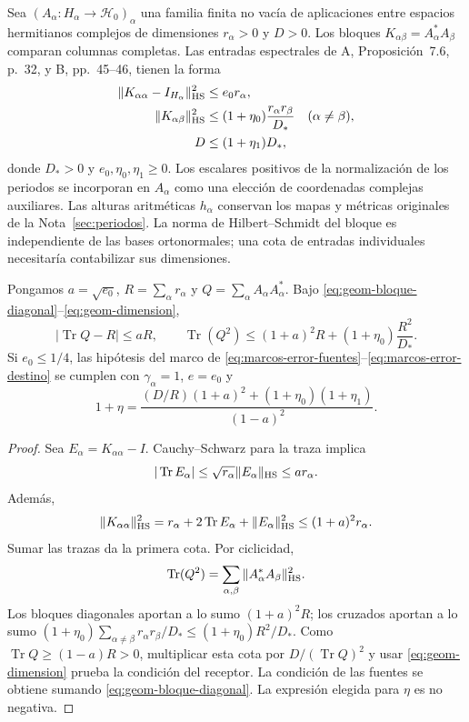 Sea $(A_\alpha:H_\alpha\to\mathcal H_0)_\alpha$ una familia
finita no vacía de aplicaciones entre
espacios hermitianos complejos de dimensiones
$r_\alpha>0$ y $D>0$.
Los bloques
$K_{\alpha\beta}=A_\alpha^*A_\beta$
comparan columnas completas.
Las entradas espectrales de A, Proposición~7.6, p.~32,
y B, pp.~45--46, tienen la forma
\begin{align}
 \|K_{\alpha\alpha}-I_{H_\alpha}\|_{\rm HS}^2
       &\le e_0r_\alpha,
       \label{eq:geom-bloque-diagonal}\\
 \|K_{\alpha\beta}\|_{\rm HS}^2
       &\le(1+\eta_0)\frac{r_\alpha r_\beta}{D_*}
       \quad(\alpha\ne\beta),
       \label{eq:geom-bloque-cruzado}\\
 D&\le(1+\eta_1)D_*,
       \label{eq:geom-dimension}
\end{align}
donde $D_*>0$ y $e_0,\eta_0,\eta_1\ge0$.
Los escalares positivos de la normalización de los periodos
se incorporan en $A_\alpha$ como una elección de coordenadas
complejas auxiliares. Las alturas aritméticas $h_\alpha$
conservan los mapas y métricas originales de la
Nota~\ref{sec:periodos}.
La norma de Hilbert--Schmidt del bloque es independiente de
las bases ortonormales; una cota de entradas individuales
necesitaría contabilizar sus dimensiones.

\begin{lema}
Pongamos $a=\sqrt{e_0}$, $R=\sum_\alpha r_\alpha$ y
$Q=\sum_\alpha A_\alpha A_\alpha^*$.
Bajo \eqref{eq:geom-bloque-diagonal}--\eqref{eq:geom-dimension},
\begin{equation}
 |\operatorname{Tr}Q-R|\le aR,\qquad
 \operatorname{Tr}(Q^2)
       \le(1+a)^2R+(1+\eta_0)\frac{R^2}{D_*}.
 \label{eq:geom-trazas}
\end{equation}
Si $e_0\le1/4$, las hipótesis del marco de
\eqref{eq:marcos-error-fuentes}--\eqref{eq:marcos-error-destino}
se cumplen con $\gamma_\alpha=1$, $e=e_0$ y
\begin{equation}
 1+\eta=
 \frac{(D/R)(1+a)^2+(1+\eta_0)(1+\eta_1)}{(1-a)^2}.
 \label{eq:geom-eta-marco}
\end{equation}
\label{lem:geom-bloques-trazas}
\end{lema}

\begin{proof}
Sea $E_\alpha=K_{\alpha\alpha}-I$.
Cauchy--Schwarz para la traza implica
\[
 |\operatorname{Tr}E_\alpha|
 \le\sqrt{r_\alpha}\|E_\alpha\|_{\rm HS}
 \le ar_\alpha.
\]
Además,
\[
 \|K_{\alpha\alpha}\|_{\rm HS}^2
 =r_\alpha+2\operatorname{Tr}E_\alpha+\|E_\alpha\|_{\rm HS}^2
 \le(1+a)^2r_\alpha.
\]
Sumar las trazas da la primera cota.
Por ciclicidad,
\[
 \operatorname{Tr}(Q^2)
    =\sum_{\alpha,\beta}
                 \|A_\alpha^*A_\beta\|_{\rm HS}^2.
\]
Los bloques diagonales aportan a lo sumo $(1+a)^2R$;
los cruzados aportan a lo sumo
$(1+\eta_0)\sum_{\alpha\ne\beta}r_\alpha r_\beta/D_*
\le(1+\eta_0)R^2/D_*$.
Como $\operatorname{Tr}Q\ge(1-a)R>0$, multiplicar esta
cota por $D/(\operatorname{Tr}Q)^2$ y usar
\eqref{eq:geom-dimension} prueba la condición del receptor.
La condición de las fuentes se obtiene sumando
\eqref{eq:geom-bloque-diagonal}. La expresión elegida
para $\eta$ es no negativa.
\end{proof}

